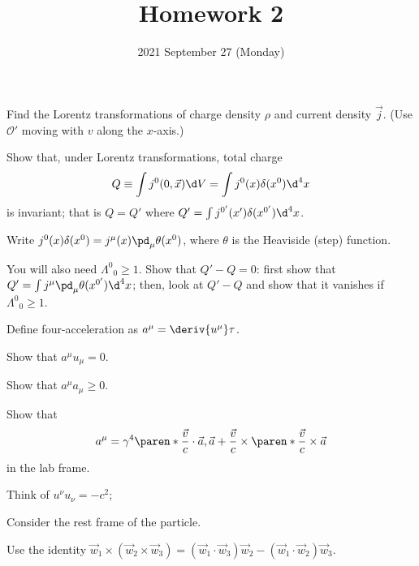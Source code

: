 \documentclass{phys151}
\title{Homework 2}
\date{2021 September 27 (Monday)}
\author{}
\begin{document}
\begin{problem}
  \leavevmode
  \begin{subproblems}
  \item Find the Lorentz transformations of charge density \(\rho\) and current
    density \(\vec j\).  (Use \(\mathcal O'\) moving with \(v\) along the
    \(x\)-axis.)
  \item Show that, under Lorentz transformations, total charge
    \[
      Q \equiv \int j^0(0, \vec x) \d V
      = \int j^0(x) \delta(x^0) \d^4 x
    \]
    is invariant; that is \(Q = Q'\) where \(Q' = \int j^{0'}(x')
    \delta(x^{0'}) \d^4 x\).
  \end{subproblems}
  \begin{hint}
    Write  \(j^0(x) \delta(x^0) = j^\mu(x) \pd_\mu \theta(x^0)\), where
    \(\theta\) is the Heaviside (step) function.

    You will also need \({\Lambda^0}_0 \ge 1\).  Show that \(Q'-Q = 0\): first
    show that  \(Q' = \int j^\mu \pd_\mu \theta(x^{0'}) \d^4 x\); then, look at
    \(Q'-Q\) and show that it vanishes if \({\Lambda^0}_0 \ge 1\).
  \end{hint}
\end{problem}

\begin{solution}
  
\end{solution}

\begin{problem}
  Define four-acceleration as \(a^\mu = \deriv {u^\mu} \tau\).
  \begin{subproblems}
    \item Show that \(a^\mu u_\mu = 0\).
    \item Show that \(a^\mu a_\mu \ge 0\).
    \item Show that
      \[
        a^\mu = \gamma^4 \paren* {
          \frac {\vec v} c \cdot \vec a,
          \vec a + \frac {\vec v} c 
          \times \paren* {\frac {\vec v} c \times \vec a}
        }
      \]
      in the lab frame.
  \end{subproblems}
  \begin{hint}
    \leavevmode
    \begin{subproblems}
    \item Think of \(u^\nu u_\nu = -c^2\);
    \item Consider the rest frame of the particle.
    \item Use the identity
      \(
        \vec w_1 \times (\vec w_2 \times \vec w_3)
        = (\vec w_1 \cdot \vec w_3) \vec w_2 
        - (\vec w_1 \cdot \vec w_2) \vec w_3
      \).
    \end{subproblems}
  \end{hint}
\end{problem}
\end{document}
